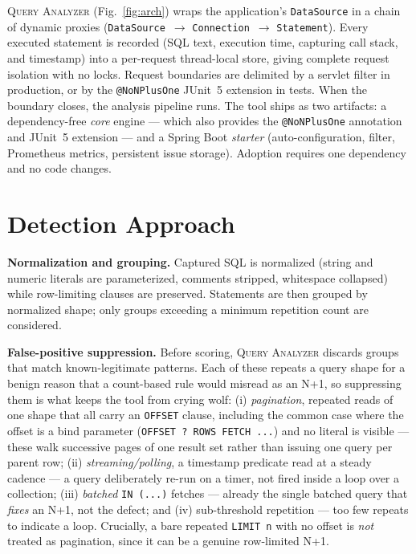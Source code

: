 \documentclass[sigplan,screen]{acmart}
\newcommand{\tool}{\textsc{Query Analyzer}}
\newcommand{\code}[1]{\texttt{\small #1}}
\begin{document}
\tool{} (Fig.~\ref{fig:arch}) wraps the application's \code{DataSource} in a
chain of dynamic proxies (\code{DataSource}~$\to$ \code{Connection}~$\to$
\code{Statement}). Every executed statement is recorded (SQL text, execution
time, capturing call stack, and timestamp) into a per-request thread-local
store, giving complete request isolation with no locks. Request boundaries are
delimited by a servlet filter in production, or by the \code{@NoNPlusOne} JUnit~5
extension in tests. When the boundary closes, the analysis pipeline runs. The
tool ships as two artifacts: a dependency-free \emph{core} engine --- which also
provides the \code{@NoNPlusOne} annotation and JUnit~5 extension --- and a Spring
Boot \emph{starter} (auto-configuration, filter, Prometheus metrics, persistent
issue storage). Adoption requires one dependency and no code changes.



\section{Detection Approach}
\noindent\textbf{Normalization and grouping.} Captured SQL is normalized (string
and numeric literals are parameterized, comments stripped, whitespace
collapsed) while row-limiting clauses are preserved. Statements are then grouped
by normalized shape; only groups exceeding a minimum repetition count are
considered.

\noindent\textbf{False-positive suppression.} Before scoring, \tool{} discards
groups that match known-legitimate patterns. Each of these repeats a query shape
for a benign reason that a count-based rule would misread as an N+1, so
suppressing them is what keeps the tool from crying wolf: (i) \emph{pagination},
repeated reads of one shape that all carry an \code{OFFSET} clause, including the
common case where the offset is a bind parameter (\code{OFFSET ? ROWS FETCH ...})
and no literal is visible --- these walk successive pages of one result set
rather than issuing one query per parent row; (ii) \emph{streaming/polling}, a
timestamp predicate read at a steady cadence --- a query deliberately re-run on a
timer, not fired inside a loop over a collection; (iii) \emph{batched}
\code{IN (...)} fetches --- already the single batched query that \emph{fixes} an
N+1, not the defect; and (iv) sub-threshold repetition --- too few repeats to
indicate a loop. Crucially, a bare repeated \code{LIMIT n} with no offset
is \emph{not} treated as pagination, since it can be a genuine row-limited N+1.
\end{document}
